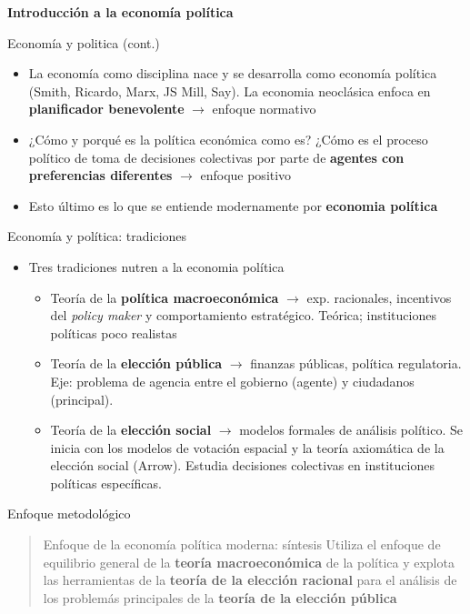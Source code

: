 \documentclass[
  ignorenonframetext,
]{beamer}
\providecommand{\tightlist}{%
  \setlength{\itemsep}{0pt}\setlength{\parskip}{0pt}}\usepackage{longtable,booktabs,array}
\begin{document}
\begin{frame}{\textbf{Introducción a la economía política}}
\begin{block}{Economía y politica (cont.)}
\protect\hypertarget{economuxeda-y-politica-cont.}{}
\begin{itemize}
\tightlist
\item
  La economía como disciplina nace y se desarrolla como economía
  política (Smith, Ricardo, Marx, JS Mill, Say). La economia neoclásica
  enfoca en \textbf{planificador benevolente} \(\longrightarrow\)
  enfoque normativo
\item
  ¿Cómo y porqué es la política económica como es? ¿Cómo es el proceso
  político de toma de decisiones colectivas por parte de \textbf{agentes
  con preferencias diferentes} \(\longrightarrow\) enfoque positivo
\item
  Esto último es lo que se entiende modernamente por \textbf{economia
  política}
\end{itemize}
\end{block}

\begin{block}{Economía y política: tradiciones}
\protect\hypertarget{economuxeda-y-poluxedtica-tradiciones}{}
\begin{itemize}
\tightlist
\item
  Tres tradiciones nutren a la economia política

  \begin{itemize}
  \tightlist
  \item
    Teoría de la \textbf{política macroeconómica} \(\longrightarrow\)
    exp. racionales, incentivos del \emph{policy maker} y comportamiento
    estratégico. Teórica; instituciones políticas poco realistas
  \item
    Teoría de la \textbf{elección pública} \(\longrightarrow\) finanzas
    públicas, política regulatoria. Eje: problema de agencia entre el
    gobierno (agente) y ciudadanos (principal).
  \item
    Teoría de la \textbf{elección social} \(\longrightarrow\) modelos
    formales de análisis político. Se inicia con los modelos de votación
    espacial y la teoría axiomática de la elección social (Arrow).
    Estudia decisiones colectivas en instituciones políticas
    específicas.
  \end{itemize}
\end{itemize}
\end{block}

\begin{block}{Enfoque metodológico}
\protect\hypertarget{enfoque-metodoluxf3gico}{}
\begin{quote}
Enfoque de la economía política moderna: síntesis Utiliza el enfoque de
equilibrio general de la \textbf{teoría macroeconómica} de la política y
explota las herramientas de la \textbf{teoría de la elección racional}
para el análisis de los problemás principales de la \textbf{teoría de la
elección pública}
\end{quote}
\end{block}


\end{frame}
\end{document}
